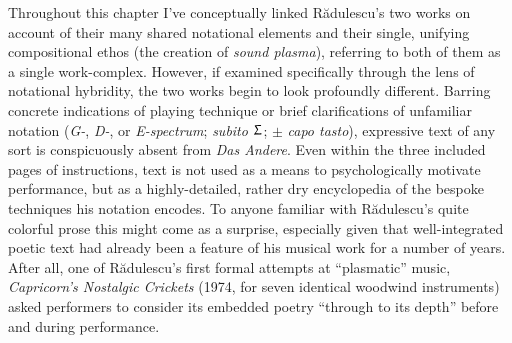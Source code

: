         Throughout this chapter I've conceptually linked R\u{a}dulescu's two works on account of their many shared notational elements and their single, unifying compositional ethos (the creation of \textit{sound plasma}), referring to both of them as a single work-complex. However, if examined specifically through the lens of notational hybridity, the two works begin to look profoundly different. Barring concrete indications of playing technique or brief clarifications of unfamiliar notation (\textit{G-}, \textit{D-}, or \textit{E-spectrum}; \textit{subito $\Upsigma$}; $\pm$ \textit{capo tasto}), expressive text of any sort is conspicuously absent from \textit{Das Andere}. Even within the three included pages of instructions, text is not used as a means to psychologically motivate performance, but as a highly-detailed, rather dry encyclopedia of the bespoke techniques his notation encodes. To anyone familiar with R\u{a}dulescu's quite colorful prose this might come as a surprise, especially given that well-integrated poetic text had already been a feature of his musical work for a number of years. After all, one of R\u{a}dulescu's first formal attempts at ``plasmatic'' music, \textit{Capricorn's Nostalgic Crickets} (1974, for seven identical woodwind instruments) asked performers to consider its embedded poetry ``through to its depth'' before and during performance.\autocite[9]{Marinescu}

